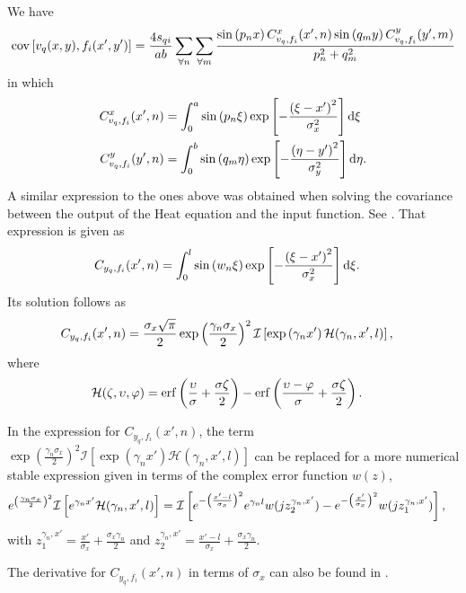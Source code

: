 \documentclass[a4paper,10pt]{article}
\newcommand{\dif}{\textrm{d}}
\DeclareMathOperator{\erf}{erf}
\DeclareMathOperator{\cov}{cov} \DeclareMathOperator{\ex}{E}
\begin{document}
We have
\begin{align}\notag
\cov\left[v_q(x,y),f_i(x',y')\right]=\frac{4s_{qi}}{ab}
\sum_{\forall n}\sum_{\forall m} \frac{\sin\left({p_n x}\right) C^x_{v_q,f_i}(x',n)
\sin\left(q_m y\right) C^y_{v_q,f_i}(y',m)}{p_n^2 + q_m^2}
\end{align}
in which
\begin{align}\notag
C^x_{v_q,f_i}(x',n) &= \int_0^a\sin\left(p_n\xi\right)
\exp\left[-\frac{\left(\xi-x'\right)^2}{\sigma^2_x}\right]\dif\xi\\\notag
C^y_{v_q,f_i}(y',n) &= \int_0^b\sin\left(q_m\eta\right)
\exp\left[-\frac{\left(\eta-y'\right)^2}{\sigma^2_y}\right]\dif\eta.
\end{align}
A similar expression to the ones above was obtained when solving the
covariance between the output of the Heat equation and the input
function. See \cite{Alvarez:HeatEquationReport}. That expression is
given as
\begin{align}
C_{y_q,f_i}(x',n)&=\int_0^l\sin\left(w_n\xi\right)
\exp\left[-\frac{\left(\xi-x'\right)^2}{\sigma^2_x}\right]\dif\xi.\notag
\end{align}
Its solution follows as
\begin{align}
C_{y_q,f_i}(x',n)&=\frac{\sigma_x\sqrt{\pi}}{2}\exp\left(\frac{\gamma_n\sigma_x}{2}\right)^2\mathcal{I}\left[\exp\left(\gamma_nx'\right)\mathcal{H}(\gamma_n,x',l)\right],\notag
\end{align}
where
\begin{align}
\notag \mathcal{H}(\zeta,\upsilon,\varphi)&=\erf\left(\frac{\upsilon}{\sigma}+\frac{\sigma \zeta}{2}\right)-\erf\left(\frac{\upsilon-\varphi}{\sigma}+\frac{\sigma \zeta}{2}\right).
\end{align}

In the expression for $C_{y_q,f_i}(x',n)$, the term
$\exp\left(\frac{\gamma_n\sigma_x}{2}\right)^2\mathcal{I}\left[\exp\left(\gamma_nx'\right)\mathcal{H}(\gamma_n,x',l)\right]$
can be replaced for a more numerical stable expression given in terms
of the complex error function $w(z)$,
\begin{align}
\notag
e^{\left(\frac{\gamma_n\sigma_x}{2}\right)^2}\mathcal{I}\left[e^{\gamma_nx'}\mathcal{H}(\gamma_n,x',l)\right]
&=\mathcal{I}\left[e^{-\left(\frac{x'-l}{\sigma_x}\right)^2}e^{\gamma_nl}w(jz_2^{\gamma_n,x'})-e^{-\left(\frac{x'}{\sigma_x}\right)^2}
w(jz_1^{\gamma_n,x'})\right],
\end{align}
with $z_1^{\gamma_n,x'}=\frac{x'}{\sigma_x}+\frac{\sigma_x \gamma_n}{2}$ and $z_2^{\gamma_n,x'}=\frac{x'-l}{\sigma_x}
+\frac{\sigma_x\gamma_n}{2}$.

The derivative for $C_{y_q,f_i}(x',n)$ in terms of $\sigma_x$ can also
be found in \cite{Alvarez:HeatEquationReport}.

\small{

}
\end{document}
